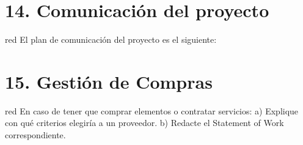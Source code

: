 \documentclass[11pt]{charter}
\begin{document}
\section{14. Comunicación del proyecto}
\label{sec:comunicaciones}

\begin{consigna}{red}
El plan de comunicación del proyecto es el siguiente:
\end{consigna}

\begin{table}[htpb]
\centering
{}
\end{table}

\section{15. Gestión de Compras}
\label{sec:compras}

\begin{consigna}{red}
En caso de tener que comprar elementos o contratar servicios:
a) Explique con qué criterios elegiría a un proveedor.
b) Redacte el Statement of Work correspondiente.
\end{consigna}
\end{document}
